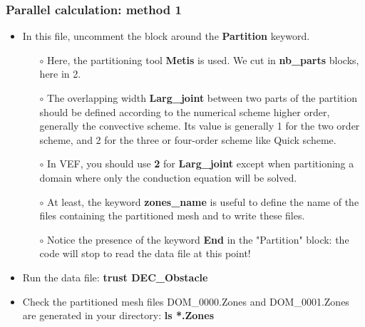 \documentclass[10pt, hyperref={unicode=true,pdfusetitle, bookmarks=true,bookmarksnumbered=false,bookmarksopen=false, breaklinks=false,pdfborder={0 0 1},backref=true,colorlinks=true,linkcolor=darkblue,pageanchor}]{beamer}
\begin{document}
\begin{frame}
\frametitle{Parallel calculation: method 1}
\begin{block}{}

\begin{itemize}
\item In this file, uncomment the block around the \textbf{Partition} keyword.
    \begin{itemize}
    \item [$\circ$] Here, the partitioning tool \textbf{Metis} is used. We cut in \textbf{nb\_parts} blocks, here in 2.
    \item [$\circ$] The overlapping width \textbf{Larg\_joint} between two parts of the partition should be defined according to the numerical scheme higher order, generally the convective scheme. Its value is generally 1 for the two order scheme, and 2 for the three or four-order scheme like Quick scheme.
    \item [$\circ$] In VEF, you should use \textbf{2} for \textbf{Larg\_joint} except when partitioning a domain where only the conduction equation will be solved.
    \item [$\circ$] At least, the keyword \textbf{zones\_name} is useful to define the name of the files containing the partitioned mesh and to write these files.
    \item [$\circ$] Notice the presence of the keyword \textbf{End} in the "Partition" block: the code will stop to read the data file at this point!
    \end{itemize}

\item Run the data file: \textbf{trust DEC\_Obstacle}

\item Check the partitioned mesh files DOM\_0000.Zones and DOM\_0001.Zones are generated in your directory: \textbf{ls *.Zones}
\end{itemize}

\end{block}
\end{frame}
\end{document}
